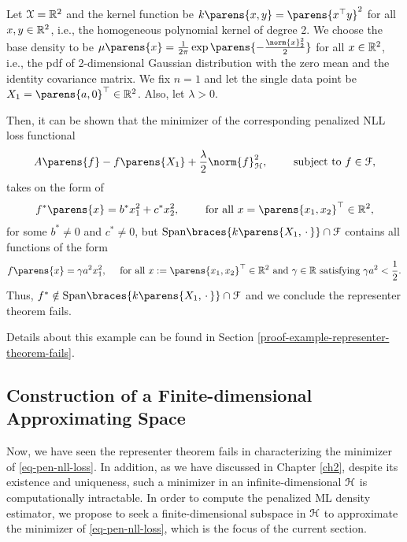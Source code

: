 \begin{example}\label{example-representer-theorem-fails}
	Let $\mathcal{X} = \mathbb{R}^2$ and the kernel function be $k \parens{x, y} = \parens{x^\top y}^2$ for all $x, y \in \mathbb{R}^2$, i.e., the homogeneous polynomial kernel of degree 2. We choose the base density to be $\mu \parens{x} = \frac{1}{2 \pi} \exp \parens{-\frac{\norm{x}_2^2}{2}}$ for all $x \in \mathbb{R}^2$, i.e., the pdf of 2-dimensional Gaussian distribution with the zero mean and the identity covariance matrix. We fix $n = 1$ and let the single data point be $X_1 = \parens{a, 0}^\top \in \Real^2$. Also, let $\lambda > 0$. 
	
	Then, it can be shown that the minimizer of the corresponding penalized NLL loss functional 
	\begin{align}\label{eq-example-nll-representer-theorem-fails-1}
		A \parens{f} - f \parens{X_1} + \frac{\lambda}{2} \norm{f}_{\calH}^2, \qquad \text{ subject to } f \in \calF, 
	\end{align}
	takes on the form of 
	\begin{align*}
		f^* \parens{x} = b^* x_1^2 + c^* x_2^2, \qquad \text{ for all } x = \parens{x_1, x_2}^\top \in \Real^2, 
	\end{align*}
	for some $b^* \neq 0$ and $c^* \neq 0$, but $\mathrm{Span} \braces{k \parens{X_1, \,\cdot\,}} \cap \calF$ contains all functions of the form
	\begin{align*}
		f \parens{x} = \gamma a^2 x_1^2, \quad \text{ for all } x := \parens{x_1, x_2}^\top \in \Real^2 \text{ and } \gamma \in \Real \text{ satisfying } \gamma a^2 < \frac{1}{2}. 
	\end{align*}
	Thus, $f^* \notin \mathrm{Span} \braces{k \parens{X_1, \,\cdot\,}} \cap \calF$ and we conclude the representer theorem fails. 
		
	Details about this example can be found in Section \ref{proof-example-representer-theorem-fails}. 
\end{example}


\subsection{Construction of a Finite-dimensional Approximating Space}

Now, we have seen the representer theorem fails in characterizing the minimizer of \eqref{eq-pen-nll-loss}. In addition, as we have discussed in Chapter \ref{ch2}, despite its existence and uniqueness, such a minimizer in an infinite-dimensional $\mathcal{H}$ is computationally intractable. In order to compute the penalized ML density estimator, we propose to seek a finite-dimensional subspace in $\mathcal{H}$ to approximate the minimizer of \eqref{eq-pen-nll-loss}, which is the focus of the current section. 

